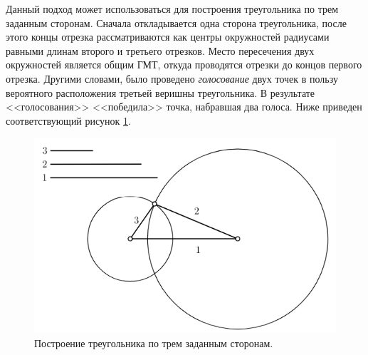 \documentclass[a4paper, 16pt]{article}
\begin{document}
    
    \noindent Данный подход может использоваться для построения треугольника по трем заданным сторонам. 
    Сначала откладывается одна сторона треугольника, после этого концы отрезка рассматриваются как центры
    окружностей радиусами равными длинам второго и третьего отрезков. Место пересечения двух окружностей
    является общим ГМТ, откуда проводятся отрезки до концов первого отрезка. Другими словами, было проведено
    \textit{голосование} двух точек в пользу вероятного расположения третьей веришны треугольника.
    В результате <<голосования>> <<победила>> точка, набравшая два голоса. Ниже приведен соответствующий
    рисунок \ref{Рис:1}.
    \begin{figure}[!htb]
        \centering
        \includegraphics[scale=1]{triang.png}
        \captionsetup{skip=0pt}
        \caption{Построение треугольника по трем заданным сторонам.}
        \label{Рис:1}
    \end{figure}
\end{document}
